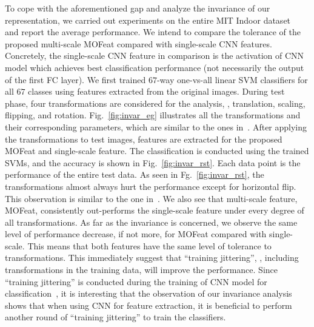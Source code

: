\documentclass[10pt,twocolumn,letterpaper]{article}
\begin{document}

To cope with the aforementioned gap and analyze the invariance of our representation, we carried out experiments on the entire MIT Indoor dataset~\cite{MIT67} and report the average performance. We intend to compare the tolerance of the proposed multi-scale MOFeat compared with single-scale CNN features. Concretely, the single-scale CNN feature in comparison is the activation of CNN model which achieves best classification performance (not necessarily the output of the first FC layer). We first trained $67$-way one-vs-all linear SVM classifiers for all $67$ classes using features extracted from the original images. During test phase, four transformations are considered for the analysis, \ie, translation, scaling, flipping, and rotation. Fig.~\ref{fig:invar_eg} illustrates all the transformations and their corresponding parameters, which are similar to the ones in~\cite{Gong14}. After applying the transformations to test images, features are extracted for the proposed MOFeat and single-scale feature. The classification is conducted using the trained SVMs, and the accuracy is shown in Fig.~\ref{fig:invar_rst}. Each data point is the performance of the entire test data. As seen in Fg.~\ref{fig:invar_rst}, the transformations almost always hurt the performance except for horizontal flip. This observation is similar to the one in~\cite{Gong14}. We also see that multi-scale feature, MOFeat, consistently out-performs the single-scale feature under every degree of all transformations. As far as the invariance is concerned, we observe the same level of performance decrease, if not more, for MOFeat compared with single-scale. This means that both features have the same level of tolerance to transformations. This immediately suggest that ``training jittering'', \ie, including transformations in the training data, will improve the performance. Since ``training jittering'' is conducted during the training of CNN model for classification~\cite{veryDeep}, it is interesting that the observation of our invariance analysis shows that when using CNN for feature extraction, it is beneficial to perform another round of ``training jittering'' to train the classifiers. 
\end{document}
